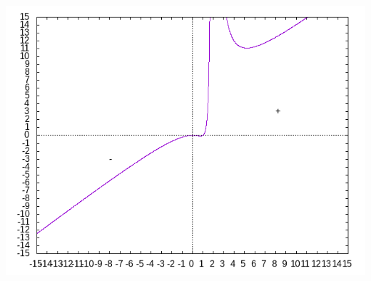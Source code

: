 \documentclass[11pt]{scrartcl}
\begin{document}
	\begin{center}
		\includegraphics[scale=0.6]{funkcja2}
	\end{center}

	
\end{document}
